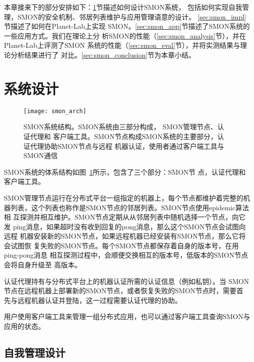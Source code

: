 
本章接来下的部分安排如下：\ref{sec:smon_design}节描述如何设计SMON系统，
包括如何实现自我管理，SMON的安全机制、邻居列表维护与应用管理语意的设计。
\ref{sec:smon_impl}节描述了如何在Planet-Lab上实现
SMON。\ref{sec:smon_app}节描述了SMON系统的一些应用方式。我们在理论上分
析SMON的性能（\ref{sec:smon_analysis}节），并在Planet-Lab上评测了SMON
系统的性能（\ref{sec:smon_eval}节），并将实测结果与理论分析结果进行了
对比。\ref{sec:smon_conclusion}节为本章小结。

\section{系统设计}
\label{sec:smon_design}

\begin{figure}[bthp]
  \centering
  \begin{minipage}{0.8\linewidth}
    \centering
    \texttt{[image: smon\_arch]}
    \caption[SMON系统结构]{SMON系统结构。SMON系统由三部分构成，
    SMON管理节点、认证代理和
    客户端工具。SMON节点构成SMON系统的主要部分，认证代理协助SMON节点与远程
    机器认证，使用者通过客户端工具与SMON通信}
    \label{fig:smon_arch}
  \end{minipage}
\end{figure}

SMON系统的体系结构如图~\ref{fig:smon_arch}所示，包含了三个部分：SMON节
点，认证代理和客户端工具。

SMON管理节点运行在分布式平台一组指定的机器上，每个节点都维护着完整的机
器列表，这个列表也称作是SMON节点的邻居列表。SMON节点使用epidemic算法相
互探测并相互维护。SMON节点定期从从邻居列表中随机选择一个节点，向它发
ping消息，如果超时没有收到回复的pong消息，那么这个SMON节点会试图向远程
机器安装新的SMON节点，如果远程机器已经安装有SMON节点，那么它将会试图恢
复失败的SMON节点。每个SMON节点都保存着自身的版本号，在用ping-pong消息
相互探测过程中，会顺便交换相互的版本号，低版本的SMON节点会将自身升级至
高版本。

认证代理持有与分布式平台上的机器认证所需的认证信息（例如私钥）。当
SMON节点在远程机器上部署新的SMON节点，或者恢复失败的SMON节点时，需要首
先与远程机器认证并登陆，这一过程需要认证代理的协助。

用户使用客户端工具来管理一组分布式应用，也可以通过客户端工具查询SMON与
应用的状态。

\subsection{自我管理设计}

